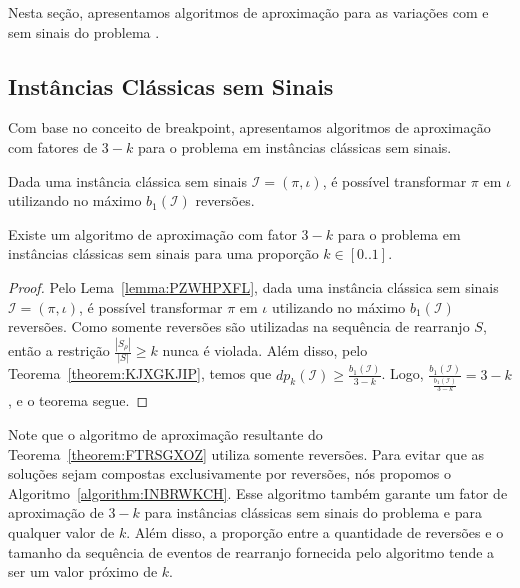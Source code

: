 Nesta seção, apresentamos algoritmos de aproximação para as variações com e sem sinais do problema \SbPRT{}.

\subsection{Instâncias Clássicas sem Sinais}

Com base no conceito de breakpoint, apresentamos algoritmos de aproximação com fatores de $3-k$ para o problema \SbPRT{} em instâncias clássicas sem sinais.

\begin{lemma}\label{lemma:PZWHPXFL}
Dada uma instância clássica sem sinais $\mathcal{I} = (\pi,\iota)$, é possível transformar $\pi$ em $\iota$ utilizando no máximo $b_1(\mathcal{I})$ reversões.
\end{lemma}

\begin{theorem}\label{theorem:FTRSGXOZ}
Existe um algoritmo de aproximação com fator $3-k$ para o problema \SbPRT{} em instâncias clássicas sem sinais para uma proporção $k \in [0..1]$.
\end{theorem}
\begin{proof}
Pelo Lema~\ref{lemma:PZWHPXFL}, dada uma instância clássica sem sinais $\mathcal{I} = (\pi,\iota)$, é possível transformar $\pi$ em $\iota$ utilizando no máximo $b_1(\mathcal{I})$ reversões. Como somente reversões são utilizadas na sequência de rearranjo $S$, então a restrição $\frac{|S_{\rho}|}{|S|} \ge k$ nunca é violada. Além disso, pelo Teorema~\ref{theorem:KJXGKJIP}, temos que $dp_{k}(\mathcal{I}) \ge \frac{b_1(\mathcal{I})}{3-k}$. Logo, $\frac{b_1(\mathcal{I})}{\frac{b_1(\mathcal{I})}{3-k}} = 3-k$, e o teorema segue.
\end{proof}

Note que o algoritmo de aproximação resultante do Teorema~\ref{theorem:FTRSGXOZ} utiliza somente reversões. Para evitar que as soluções sejam compostas exclusivamente por reversões, nós propomos o Algoritmo~\ref{algorithm:INBRWKCH}. Esse algoritmo também garante um fator de aproximação de $3-k$ para instâncias clássicas sem sinais do problema \SbPRT{} e para qualquer valor de $k$. Além disso, a proporção entre a quantidade de reversões e o tamanho da sequência de eventos de rearranjo fornecida pelo algoritmo tende a ser um valor próximo de $k$.

